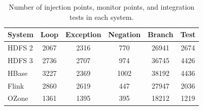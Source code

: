 \begin{table}[tb]
\footnotesize
\centering

\caption{Number of injection points, monitor points, and integration tests in each system.}

\begin{tabular}{l|ccccc}
\toprule
\textbf{System} & \textbf{Loop} & \textbf{Exception} & \textbf{Negation} & \textbf{Branch} & \textbf{Test} \\
\midrule
HDFS 2 & 2067 & 2316 & \phantom{0}770 & 26941 & 2674 \\
HDFS 3 & 2736 & 2707 & \phantom{0}974 & 36745 & 4426 \\
HBase & 3227 & 2369 &            1002 & 38192 & 4436 \\
Flink & 2860 & 2619 & \phantom{0}447 & 27947 & 2036 \\
OZone & 1361 & 1395 & \phantom{0}395 & 18212 & 1219 \\
\bottomrule
\end{tabular}
\label{tab:static-result}
\end{table}